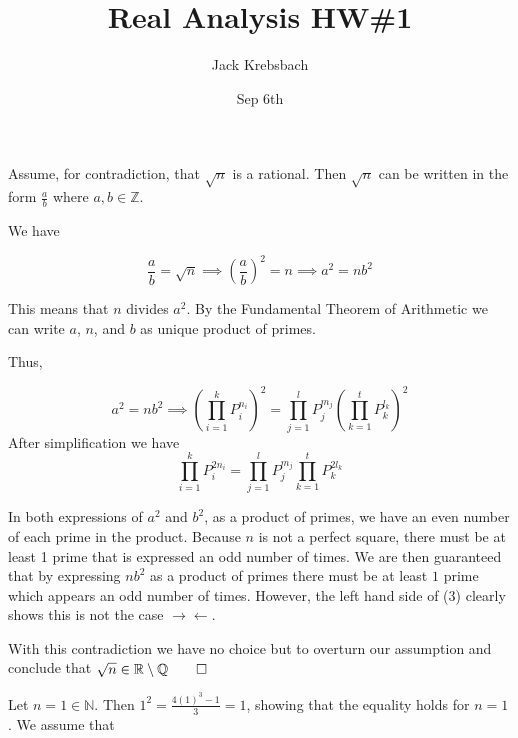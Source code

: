 \documentclass{report}
\title{Real Analysis HW\#1}
\author{Jack Krebsbach }
\date{Sep 6th}
\begin{document}
\maketitle

\sol Assume, for contradiction, that $\sqrt{n}$ is a rational. Then $\sqrt{n}$ can be written in the form $\frac{a}{b}$ where $a,b \in \mathbb{Z}$.

We have 


\begin{equation}
  \frac{a}{b} = \sqrt{n} \implies
  \left(\frac{a}{b}\right)^{2} = n \implies a^2 = n b^2
\end{equation}


This means that $n$ divides $a^{2}$. 
By the Fundamental Theorem of Arithmetic we can write $a$, $n$, and $b$ as  unique product of primes. 

Thus, 

\begin{equation}
 a^2 = n b^2 \implies
 \left(\prod^{k}_{i = 1} P_{i}^{n_i}\right)^2  = \prod_{j = 1}^{l} P_{j}^{m_j}\left(\prod^{t}_{k = 1} P_{k}^{l_k}\right)^2 
\end{equation}
After simplification we have
\begin{equation}
     \prod^{k}_{i = 1} P_{i}^{2n_i}  = \prod_{j = 1}^{l} P_{j}^{m_j}\prod^{t}_{k = 1} P_{k}^{2l_k}
\end{equation}


In both expressions of $a^2$ and $b^2$, as a product of primes, we have an even number of each prime in the product. Because $n$ is not a perfect square, there must be at least 1 prime that is expressed an odd number of times. We are then guaranteed that by expressing $nb^2$ as a product of primes there must be at least $1$ prime which appears an odd number of times. However, the left hand side of (3) clearly shows this is not the case $\rightarrow\!\leftarrow.$

With this contradiction we have no choice but to overturn our assumption and conclude that $\sqrt{n} \in \mathbb{R} \setminus \mathbb{Q} \qed$

\bigskip
{}
\sol

Let $n=1 \in \mathbb{N}$. Then $1^2 =  \frac{4 (1)^{3}-1}{3} = 1$, showing that the equality holds for $n=1$. We assume that 
\end{document}
